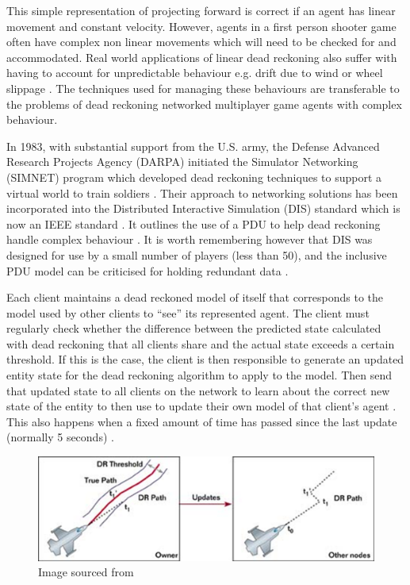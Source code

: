 \documentclass[journal]{IEEEtran}
\begin{document}
This simple representation of projecting forward is correct if an agent has linear movement and constant velocity. However, agents in a first person shooter game often have complex non linear movements which will need to be checked for and accommodated. Real world applications of linear dead reckoning also suffer with having to account for unpredictable behaviour e.g. drift due to wind or wheel slippage \cite{chung2001accurate} \cite{ojeda2004experimental}. The techniques used for managing these behaviours are transferable to the problems of dead reckoning networked multiplayer game agents with complex behaviour.

In 1983, with substantial support from the U.S. army, the Defense Advanced Research Projects Agency (DARPA) initiated the Simulator Networking (SIMNET) program which developed dead reckoning techniques to support a virtual world to train soldiers \cite{calvin1993simnet}. Their approach to networking solutions has been incorporated into the Distributed Interactive Simulation (DIS) standard which is now an IEEE standard \cite{dis1998ieee}. It outlines the use of a PDU to help dead reckoning handle complex behaviour \cite{mccarty1994virtual}. It is worth remembering however that DIS was designed for use by a small number of players (less than 50), and the inclusive PDU model can be criticised for holding redundant data \cite{henderson2001latency}.
 
Each client maintains a dead reckoned model of itself that corresponds to the model used by other clients to ``see'' its represented agent. The client must regularly check whether the difference between the predicted state calculated with dead reckoning that all clients share and the actual state exceeds a certain threshold. If this is the case, the client is then responsible to generate an updated entity state for the dead reckoning algorithm to apply to the model. Then send that updated state to all clients on the network to learn about the correct new state of the entity to then use to update their own model of that client's agent \cite{calvin1993simnet} \cite{mauve2000keep}. This also happens when a fixed amount of time has passed since the last update (normally 5 seconds) \cite{mills1992network}.

\begin{figure}[h]
    \centering
    \includegraphics[width=0.7\linewidth]{Threshold1.png}
    \caption{Image sourced from \cite{aronson1997gamasutra}}
    \label{fig:threshold}
\end{figure}
\end{document}
